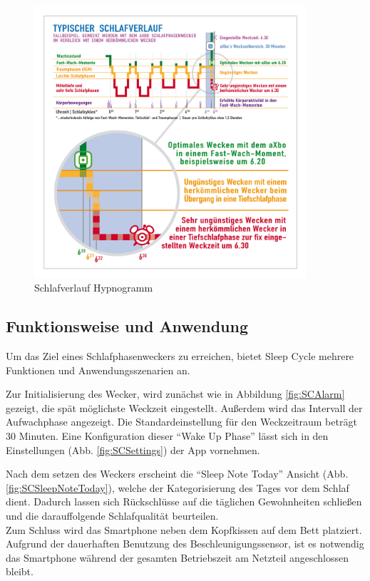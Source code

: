 \begin{figure}[H]
 \centering
 \includegraphics[width=0.9\textwidth]{images/aXbo_Schlafverlauf_Hypnogramm_DE.png}
 \caption{Schlafverlauf Hypnogramm \cite{fig:Hypnogramm}}
 \label{fig:Hypnogramm}
\end{figure}

\subsection{Funktionsweise und Anwendung}
\label{ch:Apps:sec:Sleepcycle:subsec:FuA}

Um das Ziel eines Schlafphasenweckers zu erreichen, bietet Sleep Cycle mehrere Funktionen und Anwendungsszenarien an.

Zur Initialisierung des Wecker, wird zunächst wie in Abbildung \ref{fig:SCAlarm} gezeigt, die spät möglichste Weckzeit eingestellt.
Außerdem wird das Intervall der Aufwachphase angezeigt.
Die Standardeinstellung für den Weckzeitraum beträgt 30 Minuten.
Eine Konfiguration dieser "`Wake Up Phase"' lässt sich in den Einstellungen (Abb. \ref{fig:SCSettings}) der App vornehmen.

Nach dem setzen des Weckers erscheint die "`Sleep Note Today"' Ansicht (Abb. \ref{fig:SCSleepNoteToday}), welche der Kategorisierung des Tages vor dem Schlaf dient. Dadurch lassen sich Rückschlüsse auf die täglichen Gewohnheiten schließen und die darauffolgende Schlafqualität beurteilen. \\
Zum Schluss wird das Smartphone neben dem Kopfkissen auf dem Bett platziert.
Aufgrund der dauerhaften Benutzung des Beschleunigungssensor, ist es notwendig das Smartphone während der gesamten Betriebszeit am Netzteil angeschlossen bleibt.

